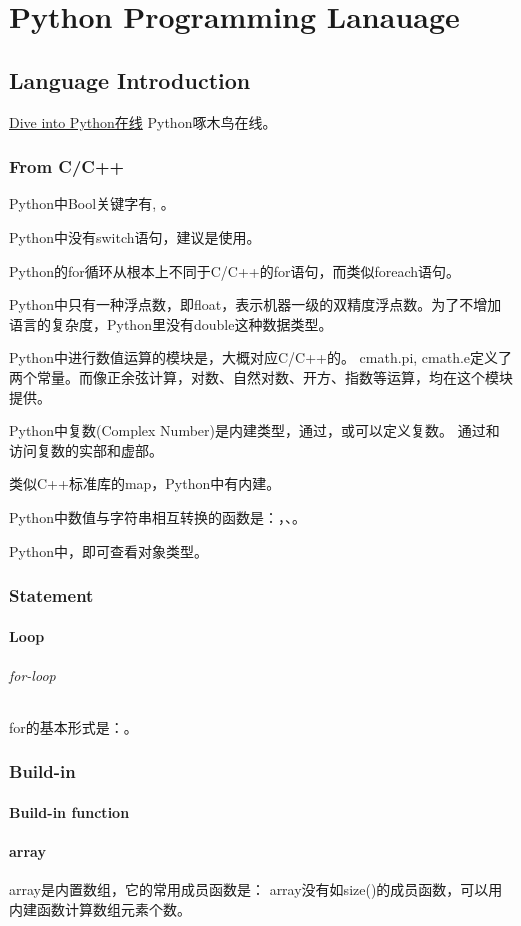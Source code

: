 \part{Python Programming Lanauage}
\chapter{Language Introduction} \label{language-python}
\noindent\href{http://www.woodpecker.org.cn/diveintopython/}{Dive into Python在线} Python啄木鸟在线。

\section{From C/C++}
Python中Bool关键字有, 。

Python中没有switch语句，建议是使用。

Python的for循环从根本上不同于C/C++的for语句，而类似foreach语句。

Python中只有一种浮点数，即float，表示机器一级的双精度浮点数。为了不增加语言的复杂度，Python里没有double这种数据类型。

Python中进行数值运算的模块是，大概对应C/C++的。
cmath.pi, cmath.e定义了两个常量。而像正余弦计算，对数、自然对数、开方、指数等运算，均在这个模块提供。

Python中复数(Complex Number)是内建类型，通过，或可以定义复数。
通过和访问复数的实部和虚部。

类似C++标准库的map，Python中有内建。

Python中数值与字符串相互转换的函数是：，、。

Python中，即可查看对象类型。

\section{Statement}
\subsection{Loop}

\paragraph{for-loop} for的基本形式是：。

\section{Build-in}
\subsection{Build-in function}

\subsection{array}
array是内置数组，它的常用成员函数是：
array没有如size()的成员函数，可以用内建函数计算数组元素个数。
